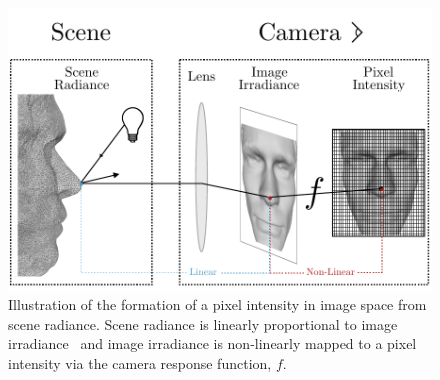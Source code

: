 \begin{figure}[t]
	\centering
	\includegraphics[width=\columnwidth]{background/images/scene_radiance_to_pixel}
	\caption{Illustration of the formation of a pixel intensity in image space
	         from scene radiance. Scene radiance is linearly proportional
	         to image irradiance~\cite{horn1979calculating} and image irradiance
	         is non-linearly mapped to a pixel intensity via the camera
	         response function, $f$.}
\label{fig:bg_sfs_scene_to_intensity}
\end{figure}

